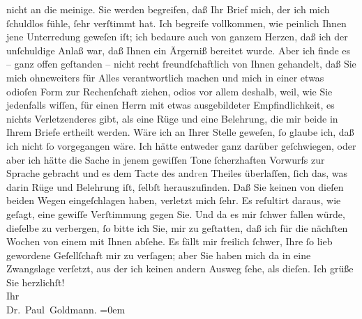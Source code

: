 \begin{ledgroupsized}[t]{13cm}
               nicht an die meinige.\pend
           \pstart
           Sie werden begreifen, daß Ihr Brief mich, der ich mich ſchuldlos fühle, ſehr
               verſtimmt hat. Ich begreife vollkommen, wie peinlich Ihnen jene Unterredung geweſen
               iſt; ich bedaure auch von ganzem Herzen, daß ich der unſchuldige Anlaß war, daß Ihnen
               ein Ärgerniß bereitet wurde. Aber ich finde es – ganz offen geſtanden – {\pb}nicht recht ſreundſchaftlich von Ihnen gehandelt,
               daß Sie mich ohneweiters für Alles verantwortlich machen und mich in einer etwas
               odioſen Form zur Rechenſchaft ziehen, odios vor allem deshalb, weil, wie Sie
               jedenfalls wiſſen, \strikeout{\textcolor{gray}{e}}für einen Herrn mit etwas ausgebildeter Empfindlichkeit, es nichts
               Verletzenderes gibt, als eine Rüge und eine Belehrung, die mir beide in Ihrem Briefe
               ertheilt werden. Wäre ich an Ihrer Stelle geweſen, ſo glaube ich, daß ich nicht ſo
               vorgegangen wäre. Ich hätte entweder ganz darüber geſchwiegen, oder aber ich hätte
               die Sache in jenem gewiſſen Tone ſcherzhaften Vorwurfs zur Sprache gebracht und es
               dem Tacte des and\textcolor{gray}{re}n Theiles überlaſſen, ſich das, was darin Rüge
               und Belehrung iſt, ſelbſt herauszufinden.\pend
           \pstart
           Daß Sie  keinen von dieſen beiden Wegen
               eingeſchlagen haben, verletzt mich ſehr. Es reſultirt daraus, wie geſagt, eine
               gewiſſe Verſtimmung gegen Sie. Und da es mir ſchwer fallen würde, dieſelbe zu
               verbergen, ſo bitte ich Sie, \strikeout{\textcolor{gray}{d}} mir zu geſtatten, daß ich für die nächſten Wochen von einem {\pb}\label{K_L02646-3v}\label{K_L02646-3h}
               mit Ihnen abſehe. Es fällt mir freilich ſchwer, Ihre ſo lieb gewordene Geſellſchaft
               mir zu verſagen; aber Sie haben mich da in eine Zwangslage verſetzt, aus der ich
               keinen andern Ausweg ſehe, als dieſen.\pend
           \pstart
           Ich grüße Sie herzlichſt! {\\[\baselineskip]}Ihr {\\[\baselineskip]}\spacefill\mbox{Dr. Paul Goldmann.}\pend
           \leftskip=0em{}
         
         \endnumbering{}\end{ledgroupsized}  \newcommand{\dateiname}{L02646}\newcommand{\titel}{Paul Goldmann an Arthur Schnitzler, 6. 12. 1889}\newcommand{\editorInnen}{Martin Anton Müller und Laura Untner}
      